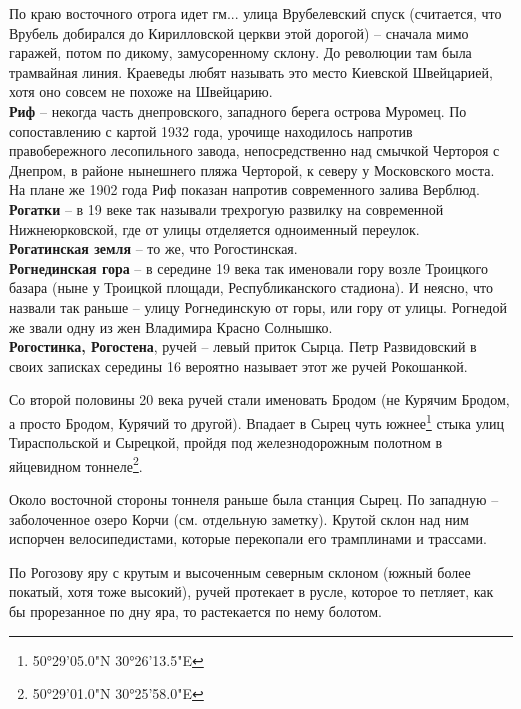 По краю восточного отрога идет гм... улица Врубелевский спуск (считается, что Врубель добирался до Кирилловской церкви этой дорогой) – сначала мимо гаражей, потом по дикому, замусоренному склону. До революции там была трамвайная линия. Краеведы любят называть это место Киевской Швейцарией, хотя оно совсем не похоже на Швейцарию.\\

\textbf{Риф} – некогда часть днепровского, западного берега острова Муромец. По сопоставлению с картой 1932 года, урочище находилось напротив правобережного лесопильного завода, непосредственно над смычкой Чертороя с Днепром, в районе нынешнего пляжа Черторой, к северу у Московского моста. На плане же 1902 года Риф показан напротив современного залива Верблюд.\\

\textbf{Рогатки} – в 19 веке так называли трехрогую развилку на современной Нижнеюрковской, где от улицы отделяется одноименный переулок.\\

\textbf{Рогатинская земля} – то же, что Рогостинская.\\

\textbf{Рогнединская гора} – в середине 19 века так именовали гору возле Троицкого базара (ны\-не у Троицкой площади, Республиканского стадиона). И неясно, что назвали так раньше – улицу Рогнединскую от горы, или гору от улицы. Рогнедой же звали одну из жен Владимира Красно Солнышко.\\

\textbf{Рогостинка, Рогостена}, ручей – левый приток Сырца. Петр Развидовский в своих записках середины 16 вероятно называет этот же ручей Рокошанкой.

Со второй половины 20 века ручей стали именовать Бродом (не Курячим Бродом, а просто Бродом, Курячий то другой). Впадает в Сырец чуть южнее\footnote{50°29'05.0"N 30°26'13.5"E} стыка улиц Тираспольской и Сырецкой, пройдя под железнодорожным полотном в яйцевидном тоннеле\footnote{50°29'01.0"N 30°25'58.0"E}.

Около восточной стороны тоннеля раньше была станция Сырец. По западную – заболоченное озеро Корчи (см. отдельную заметку). Крутой склон над ним испорчен велосипедистами, которые перекопали его трамплинами и трассами.

По Рогозову яру с крутым и высоченным северным склоном (южный более покатый, хотя тоже высокий), ручей протекает в русле, которое то петляет, как бы прорезанное по дну яра, то растекается по нему болотом.

